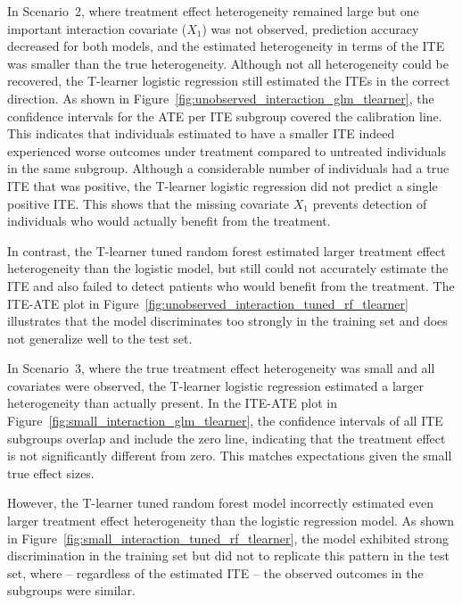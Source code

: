 \medskip


In Scenario~2, where treatment effect heterogeneity remained large but one important interaction covariate ($X_1$) was not observed, prediction accuracy decreased for both models, and the estimated heterogeneity in terms of the ITE was smaller than the true heterogeneity. Although not all heterogeneity could be recovered, the T-learner logistic regression still estimated the ITEs in the correct direction. As shown in Figure~\ref{fig:unobserved_interaction_glm_tlearner}, the confidence intervals for the ATE per ITE subgroup covered the calibration line. This indicates that individuals estimated to have a smaller ITE indeed experienced worse outcomes under treatment compared to untreated individuals in the same subgroup. Although a considerable number of individuals had a true ITE that was positive, the T-learner logistic regression did not predict a single positive ITE. This shows that the missing covariate $X_1$ prevents detection of individuals who would actually benefit from the treatment. 

In contrast, the T-learner tuned random forest estimated larger treatment effect heterogeneity than the logistic model, but still could not accurately estimate the ITE and also failed to detect patients who would benefit from the treatment. The ITE-ATE plot in Figure~\ref{fig:unobserved_interaction_tuned_rf_tlearner} illustrates that the model discriminates too strongly in the training set and does not generalize well to the test set.


\medskip


In Scenario~3, where the true treatment effect heterogeneity was small and all covariates were observed, the T-learner logistic regression estimated a larger heterogeneity than actually present. In the ITE-ATE plot in Figure~\ref{fig:small_interaction_glm_tlearner}, the confidence intervals of all ITE subgroups overlap and include the zero line, indicating that the treatment effect is not significantly different from zero. This matches expectations given the small true effect sizes.

However, the T-learner tuned random forest model incorrectly estimated even larger treatment effect heterogeneity than the logistic regression model. As shown in Figure~\ref{fig:small_interaction_tuned_rf_tlearner}, the model exhibited strong discrimination in the training set but did not to replicate this pattern in the test set, where -- regardless of the estimated ITE -- the observed outcomes in the subgroups were similar.


